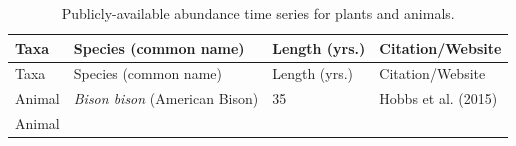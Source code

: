 \documentclass[12pt,]{article}
\begin{document}
\begin{longtable}[]{@{}llll@{}}
\caption{Publicly-available abundance time series for plants and
animals.}\tabularnewline
\toprule
\begin{minipage}[b]{0.06\columnwidth}\raggedright\strut
Taxa\strut
\end{minipage} & \begin{minipage}[b]{0.32\columnwidth}\raggedright\strut
Species (common name)\strut
\end{minipage} & \begin{minipage}[b]{0.22\columnwidth}\raggedright\strut
Length (yrs.)\strut
\end{minipage} & \begin{minipage}[b]{0.28\columnwidth}\raggedright\strut
Citation/Website\strut
\end{minipage}\tabularnewline
\midrule
\endfirsthead
\toprule
\begin{minipage}[b]{0.06\columnwidth}\raggedright\strut
Taxa\strut
\end{minipage} & \begin{minipage}[b]{0.32\columnwidth}\raggedright\strut
Species (common name)\strut
\end{minipage} & \begin{minipage}[b]{0.22\columnwidth}\raggedright\strut
Length (yrs.)\strut
\end{minipage} & \begin{minipage}[b]{0.28\columnwidth}\raggedright\strut
Citation/Website\strut
\end{minipage}\tabularnewline
\midrule
\endhead
\begin{minipage}[t]{0.06\columnwidth}\raggedright\strut
Animal\strut
\end{minipage} & \begin{minipage}[t]{0.32\columnwidth}\raggedright\strut
\emph{Bison bison} (American Bison)\strut
\end{minipage} & \begin{minipage}[t]{0.22\columnwidth}\raggedright\strut
35\strut
\end{minipage} & \begin{minipage}[t]{0.28\columnwidth}\raggedright\strut
Hobbs et al. (2015)\strut
\end{minipage}\tabularnewline
\begin{minipage}[t]{0.06\columnwidth}\raggedright\strut
Animal\strut
\end{minipage} & \begin{minipage}[t]{0.32\columnwidth}\raggedright\strut

\end{minipage}
\end{longtable}
\end{document}
